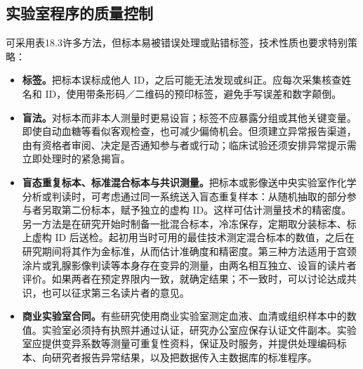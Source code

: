 \subsection{实验室程序的质量控制}
可采用表18.3许多方法，但标本易被错误处理或贴错标签，技术性质也要求特别策略：
\begin{itemize}
\item \textbf{标签。}把标本误标成他人 ID，之后可能无法发现或纠正。应每次采集核查姓名和 ID，使用带条形码／二维码的预印标签，避免手写误差和数字颠倒。
\item \textbf{盲法。}对标本而非本人测量时更易设盲；标签不应暴露分组或其他关键变量。即使自动血糖等看似客观检查，也可减少偏倚机会。但须建立异常报告渠道，由有资格者审阅、决定是否通知参与者或行动；临床试验还须安排异常提示需立即处理时的紧急揭盲。
\item \textbf{盲态重复标本、标准混合标本与共识测量。}把标本或影像送中央实验室作化学分析或判读时，可考虑通过同一系统送入盲态重复样本：从随机抽取的部分参与者另取第二份标本，赋予独立的虚构 ID。这样可估计测量技术的精密度。另一方法是在研究开始时制备一批混合标本，冷冻保存，定期取分装标本、标上虚构 ID 后送检。起初用当时可用的最佳技术测定混合标本的数值，之后在研究期间将其作为金标准，从而估计准确度和精密度。第三种方法适用于宫颈涂片或乳腺影像判读等本身存在变异的测量，由两名相互独立、设盲的读片者评价。如果两者在预定界限内一致，就确定结果；不一致时，可以讨论达成共识，也可以征求第三名读片者的意见。
\item \textbf{商业实验室合同。}有些研究使用商业实验室测定血液、血清或组织样本中的数值。实验室必须持有执照并通过认证，研究办公室应保存认证文件副本。实验室应提供变异系数等测量可重复性资料，保证及时服务，并提供处理编码标本、向研究者报告异常结果，以及把数据传入主数据库的标准程序。
\end{itemize}

